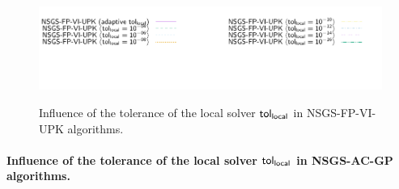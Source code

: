\documentclass[a4paper]{article}
\begin{document}
\begin{figure}
{\includegraphics[height=\legendheight]{../figure/NSGS/LocalTol/VI/1.0e-08/50/time/profile-Chain_legend.pdf}} 
\caption{Influence of the tolerance of the local solver $\sf tol_{local}$ in {\sf NSGS-FP-VI-UPK} algorithms.}
 \label{fig:NSGS/LocalTol/VI}
\end{figure}

\paragraph{Influence of the tolerance of the local solver $\sf tol_{local}$ in {\sf NSGS-AC-GP} algorithms.}
\end{document}
